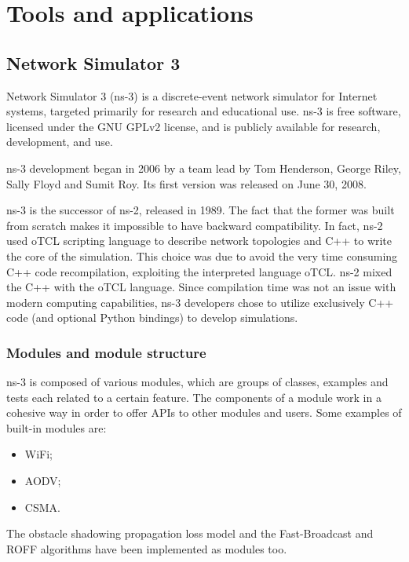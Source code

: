

\chapter{Tools and applications}
	\section{Network Simulator 3}
		\label{sec:ns3}
		Network Simulator 3 (ns-3) is a discrete-event network simulator for Internet systems, targeted primarily for research and educational use. ns-3 is free software, licensed under the GNU GPLv2 license, and is publicly available for research, development, and use.
		
		
		ns-3 development began in 2006 by a team lead by Tom Henderson, George Riley, Sally Floyd and Sumit Roy. Its first version was released on June 30, 2008. 
		
		
		ns-3 is the successor of ns-2, released in 1989. The fact that the former was built from scratch makes it impossible to have backward compatibility. In fact, ns-2 used oTCL scripting language to describe network topologies and C++ to write the core of the simulation. This choice was due to avoid the very time consuming C++ code recompilation, exploiting the interpreted language oTCL. ns-2 mixed the  C++ with the  oTCL language. Since compilation time was not an issue with modern computing capabilities, ns-3 developers chose to utilize exclusively C++ code (and optional Python bindings) to develop simulations.
		
		\subsection{Modules and module structure}
		ns-3 is composed of various modules, which are groups of classes, examples and tests each related to a certain feature. The components of a module work in a cohesive way in order to offer APIs to other modules and users. Some examples of built-in modules are:
		\begin{itemize}
			\item WiFi;
			\item AODV; 
			\item CSMA.
		\end{itemize}
		The obstacle shadowing propagation loss model and the Fast-Broadcast and ROFF algorithms have been implemented as modules too.
		
